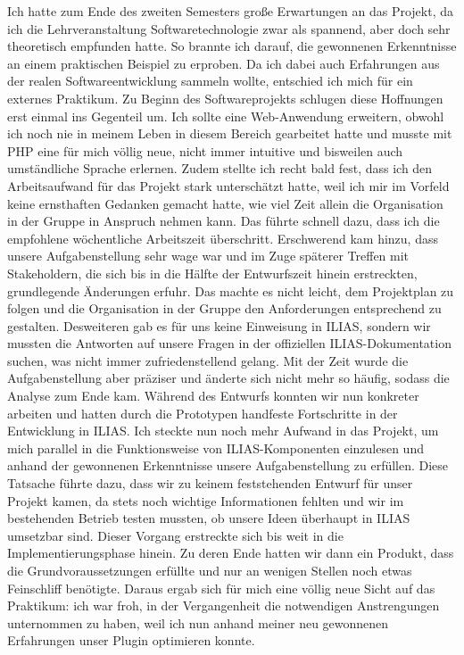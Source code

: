 \documentclass[a4paper]{scrreprt}
\begin{document}
Ich hatte zum Ende des zweiten Semesters große Erwartungen an das Projekt, da ich die Lehrveranstaltung Softwaretechnologie zwar als spannend, aber doch sehr theoretisch empfunden hatte. So brannte ich darauf, die gewonnenen Erkenntnisse an einem praktischen Beispiel zu erproben. Da ich dabei auch Erfahrungen aus der realen Softwareentwicklung sammeln wollte, entschied ich mich für ein externes Praktikum.
Zu Beginn des Softwareprojekts schlugen diese Hoffnungen erst einmal ins Gegenteil um. Ich sollte eine Web-Anwendung erweitern, obwohl ich noch nie in meinem Leben in diesem Bereich gearbeitet hatte und musste mit PHP eine für mich völlig neue, nicht immer intuitive und bisweilen auch umständliche Sprache erlernen. Zudem stellte ich recht bald fest, dass ich den Arbeitsaufwand für das Projekt stark unterschätzt hatte, weil ich mir im Vorfeld keine ernsthaften Gedanken gemacht hatte, wie viel Zeit allein die Organisation in der Gruppe in Anspruch nehmen kann. Das führte schnell dazu, dass ich die empfohlene wöchentliche Arbeitszeit überschritt. Erschwerend kam hinzu, dass unsere Aufgabenstellung sehr wage war und im Zuge späterer Treffen mit Stakeholdern, die sich bis in die Hälfte der Entwurfszeit hinein erstreckten, grundlegende Änderungen erfuhr. Das machte es nicht leicht, dem Projektplan zu folgen und die Organisation in der Gruppe den Anforderungen entsprechend zu gestalten. Desweiteren gab es für uns keine Einweisung in ILIAS, sondern wir mussten die Antworten auf unsere Fragen in der offiziellen ILIAS-Dokumentation suchen, was nicht immer zufriedenstellend gelang.
Mit der Zeit wurde die Aufgabenstellung aber präziser und änderte sich nicht mehr so häufig, sodass die Analyse zum Ende kam. Während des Entwurfs konnten wir nun konkreter arbeiten und hatten durch die Prototypen handfeste Fortschritte in der Entwicklung in ILIAS. Ich steckte nun noch mehr Aufwand in das Projekt, um mich parallel in die Funktionsweise von ILIAS-Komponenten einzulesen und anhand der gewonnenen Erkenntnisse unsere Aufgabenstellung zu erfüllen. Diese Tatsache führte dazu, dass wir zu keinem feststehenden Entwurf für unser Projekt kamen, da stets noch wichtige Informationen fehlten und wir im bestehenden Betrieb testen mussten, ob unsere Ideen überhaupt in ILIAS umsetzbar sind.
Dieser Vorgang erstreckte sich bis weit in die Implementierungsphase hinein. Zu deren Ende hatten wir dann ein Produkt, dass die Grundvoraussetzungen erfüllte und nur an wenigen Stellen noch etwas Feinschliff benötigte. Daraus ergab sich für mich eine völlig neue Sicht auf das Praktikum: ich war froh, in der Vergangenheit die notwendigen Anstrengungen unternommen zu haben, weil ich nun anhand meiner neu gewonnenen Erfahrungen unser Plugin optimieren konnte.
\end{document}
